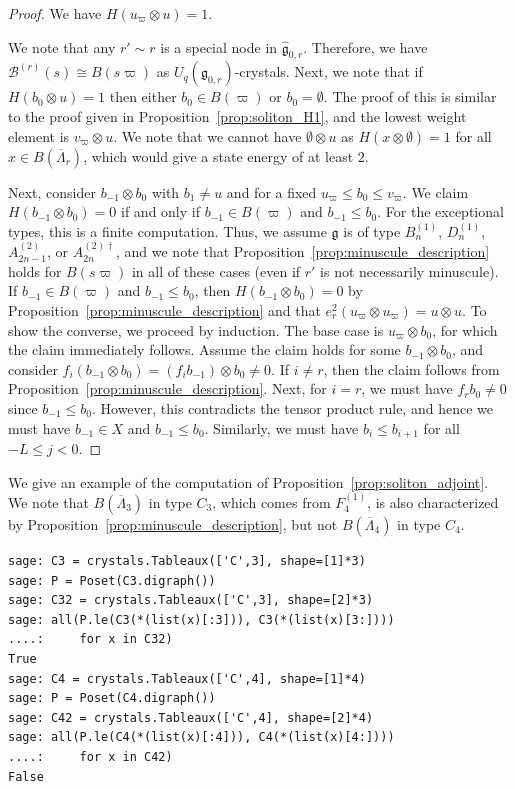 \documentclass[reqno]{amsart}
\newcommand{\g}{\mathfrak{g}}
\newcommand{\clfw}{\overline{\Lambda}} %
\newcommand{\iso}{\cong}
\theoremstyle{plain}
\theoremstyle{definition}
\numberwithin{equation}{section}
\begin{document}
\begin{proof}
We have $H(u_{\varpi} \otimes u) = 1$.

We note that any $r' \sim r$ is a special node in $\widehat{\g}_{0,r}$.
Therefore, we have $\mathcal{B}^{(r)}(s) \iso B(s\varpi)$ as $U_q(\g_{0,r})$-crystals.
Next, we note that if $H(b_0 \otimes u) = 1$ then either $b_0 \in B(\varpi)$ or $b_0 = \emptyset$.
The proof of this is similar to the proof given in Proposition~\ref{prop:soliton_H1}, and the lowest weight element is $v_{\varpi} \otimes u$.
We note that we cannot have $\emptyset \otimes u$ as $H(x \otimes \emptyset) = 1$ for all $x \in B(\clfw_r)$, which would give a state energy of at least $2$.

Next, consider $b_{-1} \otimes b_0$ with $b_1 \neq u$ and for a fixed $u_{\varpi} \leq b_0 \leq v_{\varpi}$.
We claim $H(b_{-1} \otimes b_0) = 0$ if and only if $b_{-1} \in B(\varpi)$ and $b_{-1} \leq b_0$.
For the exceptional types, this is a finite computation.
Thus, we assume $\g$ is of type $B_n^{(1)}$, $D_n^{(1)}$, $A_{2n-1}^{(2)}$, or $A_{2n}^{(2)\dagger}$, and we note that Proposition~\ref{prop:minuscule_description} holds for $B(s\varpi)$ in all of these cases (even if $r'$ is not necessarily minuscule).
If $b_{-1} \in B(\varpi)$ and $b_{-1} \leq b_0$, then $H(b_{-1} \otimes b_0) = 0$ by Proposition~\ref{prop:minuscule_description} and that $e_r^2(u_{\varpi} \otimes u_{\varpi}) = u \otimes u$.
To show the converse, we proceed by induction.
The base case is $u_{\varpi} \otimes b_0$, for which the claim immediately follows.
Assume the claim holds for some $b_{-1} \otimes b_0$, and consider $f_i(b_{-1} \otimes b_0) = (f_i b_{-1}) \otimes b_0 \neq 0$.
If $i \neq r$, then the claim follows from Proposition~\ref{prop:minuscule_description}.
Next, for $i = r$, we must have $f_r b_0 \neq 0$ since $b_{-1} \leq b_0$.
However, this contradicts the tensor product rule, and hence we must have $b_{-1} \in X$ and $b_{-1} \leq b_0$.
Similarly, we must have $b_i \leq b_{i+1}$ for all $-L \leq j < 0$.
\end{proof}

We give an example of the computation of Proposition~\ref{prop:soliton_adjoint}.
We note that $B(\clfw_3)$ in type $C_3$, which comes from $F_4^{(1)}$, is also characterized by Proposition~\ref{prop:minuscule_description}, but not $B(\clfw_4)$ in type $C_4$.

\begin{lstlisting}
sage: C3 = crystals.Tableaux(['C',3], shape=[1]*3)
sage: P = Poset(C3.digraph())
sage: C32 = crystals.Tableaux(['C',3], shape=[2]*3)
sage: all(P.le(C3(*(list(x)[:3])), C3(*(list(x)[3:])))
....:     for x in C32)
True
sage: C4 = crystals.Tableaux(['C',4], shape=[1]*4)
sage: P = Poset(C4.digraph())
sage: C42 = crystals.Tableaux(['C',4], shape=[2]*4)
sage: all(P.le(C4(*(list(x)[:4])), C4(*(list(x)[4:])))
....:     for x in C42)
False
\end{lstlisting}
\end{document}
